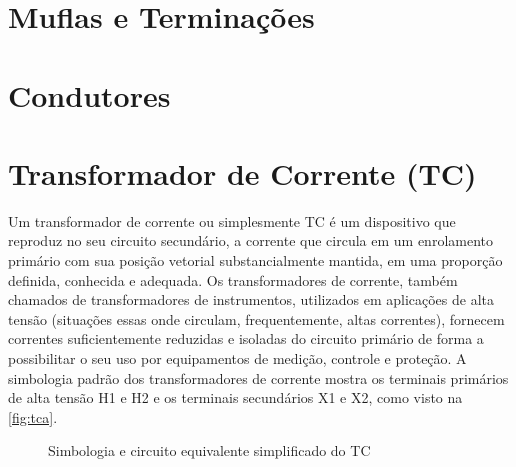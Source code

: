 \documentclass[a5paper,english,spanish,brazil]{ufsc-thesis}
\begin{document}
	\section{Muflas e Terminações}

	\section{Condutores}

	\section{Transformador de Corrente (TC)}
		Um transformador de corrente ou simplesmente TC é um dispositivo que reproduz no seu circuito secundário, a corrente que circula em um enrolamento primário com sua posição vetorial substancialmente mantida, em uma proporção definida, conhecida e adequada. Os transformadores de corrente, também chamados de transformadores de instrumentos, utilizados em aplicações de alta tensão (situações essas onde circulam, frequentemente, altas correntes), fornecem correntes suficientemente reduzidas e isoladas do circuito primário de forma a possibilitar o seu uso por equipamentos de medição, controle e proteção. A simbologia padrão dos transformadores de corrente mostra os terminais primários de alta tensão H1 e H2 e os terminais secundários X1 e X2, como visto na \autoref{fig:tca}.

		\begin{figure}[htb]
		  \caption{Simbologia e circuito equivalente simplificado do TC}
		  \label{fig:tca}
		  \centering
		\end{figure}\par
\end{document}
